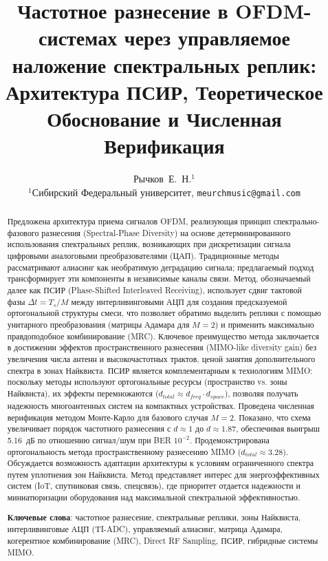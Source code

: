 \documentclass[a4paper,12pt]{article}
\title{\textbf{Частотное разнесение в OFDM-системах через управляемое наложение спектральных реплик:\\ Архитектура ПСИР, Теоретическое Обоснование и Численная Верификация}}
\author{Рычков~Е.~Н.$^{1}$ \\ $^{1}$Сибирский Федеральный университет, \texttt{meurchmusic@gmail.com}}
\date{}
\numberwithin{equation}{section}
\begin{document}
\maketitle

\begin{abstract}
Предложена архитектура приема сигналов OFDM, реализующая принцип спектрально-фазового разнесения (Spectral-Phase Diversity) на основе детерминированного использования спектральных реплик, возникающих при дискретизации сигнала цифровыми аналоговыми преобразователями (ЦАП). Традиционные методы рассматривают алиасинг как необратимую деградацию сигнала; предлагаемый подход трансформирует эти компоненты в независимые каналы связи. Метод, обозначаемый далее как ПСИР (Phase-Shifted Interleaved Receiving), использует сдвиг тактовой фазы $\Delta t = T_s/M$ между интерливинговыми АЦП для создания предсказуемой ортогональной структуры смеси, что позволяет обратимо выделить реплики с помощью унитарного преобразования (матрицы Адамара для $M=2$) и применить максимально правдоподобное комбинирование (MRC). Ключевое преимущество метода заключается в достижении эффектов пространственного разнесения (MIMO-like diversity gain) без увеличения числа антенн и высокочастотных трактов, ценой занятия дополнительного спектра в зонах Найквиста. ПСИР является комплементарным к технологиям MIMO: поскольку методы используют ортогональные ресурсы (пространство vs. зоны Найквиста), их эффекты перемножаются ($d_{total} \approx d_{freq} \cdot d_{space}$), позволяя получать надежность многоантенных систем на компактных устройствах. Проведена численная верификация методом Монте-Карло для базового случая $M=2$. Показано, что схема увеличивает порядок частотного разнесения с $d \approx 1$ до $d \approx 1.87$, обеспечивая выигрыш 5.16~дБ по отношению сигнал/шум при BER $10^{-2}$. Продемонстрирована ортогональность метода пространственному разнесению MIMO ($d_{total} \approx 3.28$). Обсуждается возможность адаптации архитектуры к условиям ограниченного спектра путем уплотнения зон Найквиста. Метод представляет интерес для энергоэффективных систем (IoT, спутниковая связь, спецсвязь), где приоритет отдается надежности и миниатюризации оборудования над максимальной спектральной эффективностью.

\vspace{0.3cm}
\noindent\textbf{Ключевые слова}: частотное разнесение, спектральные реплики, зоны Найквиста, интерливинговые АЦП (TI-ADC), управляемый алиасинг, матрица Адамара, когерентное комбинирование (MRC), Direct RF Sampling, ПСИР, гибридные системы MIMO.
\end{abstract}
\end{document}
